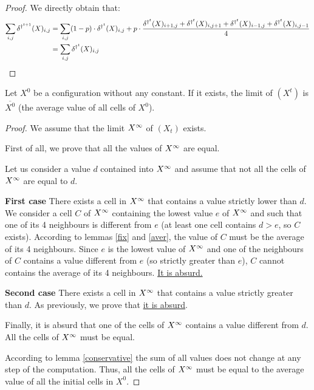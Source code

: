 \begin{proof}
  We directly obtain that:
  \[\begin{split}
    \sum_{i,j} \delta^{\dag^{t+1}}(X)_{i,j} & = \sum_{i,j} (1-p) \cdot \delta^{\dag^t}(X)_{i,j} + p \cdot \frac{\delta^{\dag^t}(X)_{i+1,j} + \delta^{\dag^t}(X)_{i,j+1} + \delta^{\dag^t}(X)_{i-1,j} + \delta^{\dag^t}(X)_{i,j-1}}{4} \\
        & = \sum_{i,j} \delta^{\dag^t}(X)_{i,j}
  \end{split} \]
\end{proof}

\begin{prop}
  \label{limnoc}
  Let $X^0$ be a configuration without any constant. If it exists, the limit of $(X^t)$ is $\overline{X^0}$ (the average value of all cells of $X^0$).
\end{prop}

\begin{proof}
  We assume that the limit $X^{\infty}$ of $(X_t)$ exists.
  
  First of all, we prove that all the values of $X^{\infty}$ are equal. 
  
  Let us consider a value $d$ contained into $X^{\infty}$ and assume that not all the cells of $X^{\infty}$ are equal to $d$.
  
  \textbf{First case} There exists a cell in $X^{\infty}$ that contains a value strictly lower than $d$. We consider a cell $C$ of $X^{\infty}$ containing the lowest value $e$ of $X^{\infty}$ and such that one of its 4 neighbours is different from $e$ (at least one cell contains $d > e$, so $C$ exists). According to lemmas \ref{fix} and \ref{aver}, the value of $C$ must be the average of its 4 neighbours. Since $e$ is the lowest value of $X^{\infty}$ and one of the neighbours of $C$ contains a value different from $e$ (so strictly greater than $e$), $C$ cannot contains the average of its 4 neighbours. \underline{It is absurd.}

  \textbf{Second case} There exists a cell in $X^{\infty}$ that contains a value strictly greater than $d$. As previously, we prove that \underline{it is absurd}.
  
  Finally, it is absurd that one of the cells of $X^{\infty}$ contains a value different from $d$. All the cells of $X^{\infty}$ must be equal.
  
  According to lemma \ref{conservative} the sum of all values does not change at any step of the computation. Thus, all the cells of $X^{\infty}$ must be equal to the average value of all the initial cells in $X^0$.  
\end{proof}

